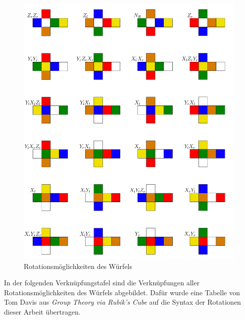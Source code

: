 \documentclass[12pt,a4paper, usenames, dvipsnames]{article}
\theoremstyle{mystyle}
\theoremstyle{definition}
\begin{document}
\begin{figure}[H]
\centering
\includegraphics[scale=0.065]{AlleRotationen.png}
\caption{Rotationsmöglichkeiten des Würfels}
\label{AbbildungWürfelRotationAlleSeiten}
\end{figure}





In der folgenden Verknüpfungstafel sind die Verknüpfungen aller Rotationsmöglichkeiten des Würfels abgebildet. Dafür wurde eine Tabelle von Tom Davis aus \textit{Group Theory via Rubik's Cube} \cite{TD} auf die Syntax der Rotationen dieser Arbeit übertragen. 

\vspace*{1em}
\end{document}
